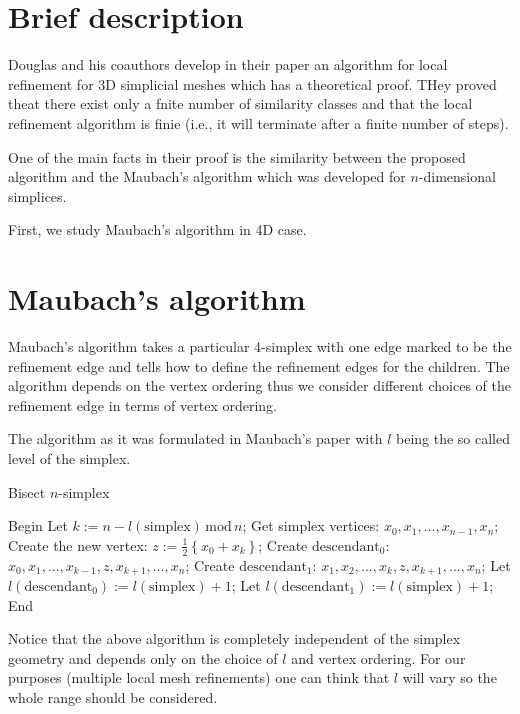 \documentclass[a4paper,12pt]{amsart}
\numberwithin{equation}{section}
\begin{document}
\section{Brief description}

Douglas and his coauthors develop in their paper an algorithm for local refinement for 3D simplicial meshes which has a theoretical proof. THey proved theat there exist only a fnite number of similarity classes and that the local refinement algorithm is finie (i.e., it will terminate after a finite number of steps).

One of the main facts in their proof is the similarity between the proposed algorithm and the Maubach's algorithm which was developed for $n$-dimensional simplices.

First, we study Maubach's algorithm in 4D case.

\section{Maubach's algorithm}

Maubach's algorithm takes a particular 4-simplex with one edge marked to be the refinement edge and tells how to define the refinement edges for the children. The algorithm depends on the vertex ordering thus we consider different choices of the refinement edge in terms of vertex ordering.

The algorithm as it was formulated in Maubach's paper with $l$ being the so called level of the simplex.
\begin{algorithm}
    \caption{Bisect $n$-simplex}
    \label{euclid}
    \begin{algorithmic}[1] %
            \State Begin
            \State Let $k:= n - l(\mbox{simplex}) \, \mbox{mod} \, n$;
            \State Get simplex vertices: $x_0, x_1, ..., x_{n-1}, x_n$;
            \State Create the new vertex: $z := \frac{1}{2} \left\{ x_0 + x_k \right\}$;
            \State Create $\mbox{descendant}_0$: $x_0, x_1, ..., x_{k-1}, z, x_{k+1}, ..., x_n$;
            \State Create $\mbox{descendant}_1$: $x_1, x_2, ..., x_k, z, x_{k+1}, ..., x_n$;
            \State Let $l(\mbox{descendant}_0) := l(\mbox{simplex}) + 1$;
            \State Let $l(\mbox{descendant}_1) := l(\mbox{simplex}) + 1$;
            \State End
    \end{algorithmic}
\end{algorithm}
Notice that the above algorithm is completely independent of the simplex geometry and depends only on the choice of $l$ and vertex ordering. For our purposes (multiple local mesh refinements) one can think that $l$ will vary so the whole range should be considered.
\end{document}
